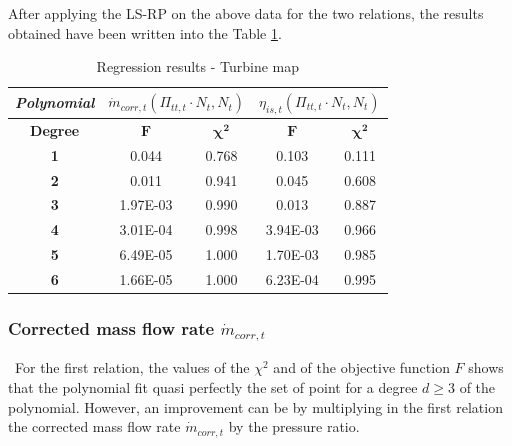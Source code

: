 After applying the LS-RP on the above data for the two relations, the results obtained have been written into the Table \ref{tab:reg_turbmap1}. 
\begin{longtable}[c]{@{}ccc|cc@{}}
\caption{Regression results - Turbine map}
\label{tab:reg_turbmap1}\\
\toprule
\textit{\textbf{Polynomial}} & \multicolumn{2}{c|}{$\dot{m}_{corr,t}(\Pi_{tt,t}\cdot N_t,N_t)$} & \multicolumn{2}{c}{$\eta_{is,t}(\Pi_{tt,t}\cdot N_t,N_t)$} \\* \midrule
\endfirsthead
%
\endhead
%
\bottomrule
\endfoot
%
\endlastfoot
%
\textbf{Degree}              & \multicolumn{1}{c}{$\mathbf{F}$}                  & \multicolumn{1}{c|}{$\mathbf{\chi^2}$}                 & \multicolumn{1}{c}{$\mathbf{F}$}               & \multicolumn{1}{c}{$\mathbf{\chi^2}$}               \\
\textbf{1}                   & 0.044                       & 0.768                             & 0.103                    & 0.111                           \\
\textbf{2}                   & 0.011                       & 0.941                             & 0.045                    & 0.608                           \\
\textbf{3}                   & 1.97E-03                    & 0.990                             & 0.013                    & 0.887                           \\
\textbf{4}                   & 3.01E-04                    & 0.998                             & 3.94E-03                 & 0.966                           \\
\textbf{5}                   & 6.49E-05                    & 1.000                             & 1.70E-03                 & 0.985                           \\
\textbf{6}                   & 1.66E-05                    & 1.000                             & 6.23E-04                 & 0.995                           \\* \bottomrule
\end{longtable}

\subsubsection{Corrected mass flow rate $\dot{m}_{corr,t}$}
\quad\ For the first relation, the values of the $\chi^2$ and of the objective function $F$ shows that the polynomial fit quasi perfectly the set of point for a degree $d \geq 3$ of the polynomial. However, an improvement can be by multiplying in the first relation the corrected mass flow rate $\dot{m}_{corr,t}$ by the pressure ratio.

